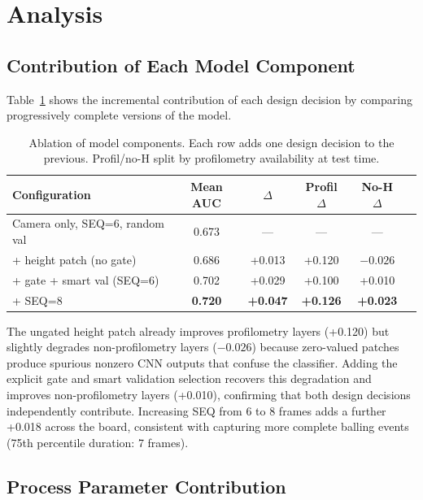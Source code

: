 \documentclass[12pt, letterpaper]{article}
\begin{document}
\section{Analysis}

\subsection{Contribution of Each Model Component}

Table~\ref{tab:ablation} shows the incremental contribution of
each design decision by comparing progressively complete versions
of the model.

\begin{table}[H]
\centering
\caption{Ablation of model components. Each row adds one
design decision to the previous. Profil/no-H split by
profilometry availability at test time.}
\label{tab:ablation}
\begin{tabular}{lccccc}
\toprule
Configuration & Mean AUC & $\Delta$ & Profil $\Delta$ & No-H $\Delta$ \\
\midrule
Camera only, SEQ=6, random val   & 0.673 & ---    & ---    & --- \\
+ height patch (no gate)         & 0.686 & +0.013 & +0.120 & $-0.026$ \\
+ gate + smart val (SEQ=6)       & 0.702 & +0.029 & +0.100 & +0.010 \\
+ SEQ=8                          & \textbf{0.720} & \textbf{+0.047} & \textbf{+0.126} & \textbf{+0.023} \\
\bottomrule
\end{tabular}
\end{table}

The ungated height patch already improves profilometry layers
(+0.120) but slightly degrades non-profilometry layers ($-0.026$)
because zero-valued patches produce spurious nonzero CNN outputs
that confuse the classifier. Adding the explicit gate and smart
validation selection recovers this degradation and improves
non-profilometry layers (+0.010), confirming that both design
decisions independently contribute. Increasing SEQ from 6 to 8
frames adds a further +0.018 across the board, consistent with
capturing more complete balling events (75th percentile duration:
7 frames).

\subsection{Process Parameter Contribution}
\end{document}
